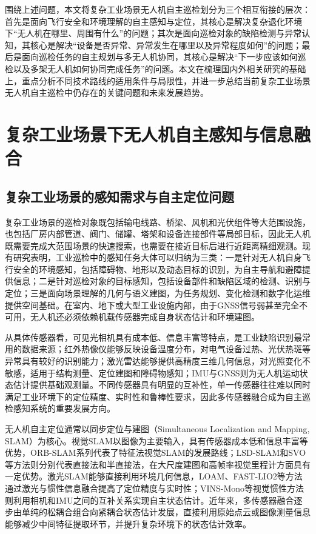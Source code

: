 围绕上述问题，本文将复杂工业场景无人机自主巡检划分为三个相互衔接的层次：首先是面向飞行安全和环境理解的自主感知与定位，其核心是解决复杂退化环境下“无人机在哪里、周围有什么”的问题；其次是面向巡检对象的缺陷检测与异常认知，其核心是解决“设备是否异常、异常发生在哪里以及异常程度如何”的问题；最后是面向巡检任务的自主规划与多无人机协同，其核心是解决“下一步应该如何巡检以及多架无人机如何协同完成任务”的问题。本文在梳理国内外相关研究的基础上，重点分析不同技术路线的适用条件与局限性，并进一步总结当前复杂工业场景无人机自主巡检中仍存在的关键问题和未来发展趋势。

\section{复杂工业场景下无人机自主感知与信息融合}

\subsection{复杂工业场景的感知需求与自主定位问题}

复杂工业场景的巡检对象既包括输电线路、桥梁、风机和光伏组件等大范围设施，也包括厂房内部管道、阀门、储罐、塔架和设备连接部件等局部目标，因此无人机既需要完成大范围场景的快速搜索，也需要在接近目标后进行近距离精细观测。现有研究表明，工业巡检中的感知任务大体可以归纳为三类：一是针对无人机自身飞行安全的环境感知，包括障碍物、地形以及动态目标的识别，为自主导航和避障提供信息；二是针对巡检对象的目标感知，包括设备部件和缺陷区域的检测、识别与定位；三是面向场景理解的几何与语义建图，为任务规划、变化检测和数字化运维提供空间基础\cite{kanellakis2017survey,yeum2015vision,cha2017deep,nex2014uav,tao2019digital}。在室内、地下或大型工业设施内部，由于GNSS信号弱甚至完全不可用，无人机还必须依赖机载传感器完成自身状态估计和环境建图\cite{ozaslan2017autonomous,petrlik2020robust,nil2012review}。

从具体传感器看，可见光相机具有成本低、信息丰富等特点，是工业缺陷识别最常用的数据来源；红外热像仪能够反映设备温度分布，对电气设备过热、光伏热斑等异常具有较好的识别能力\cite{jadin2012recent,usamentiaga2014infrared}；激光雷达能够提供高精度三维几何信息，对光照变化不敏感，适用于结构测量、定位建图和障碍物感知\cite{wujq2021review,zhang2014loam}；IMU与GNSS则为无人机运动状态估计提供基础观测量。不同传感器具有明显的互补性，单一传感器往往难以同时满足工业环境下的定位精度、实时性和鲁棒性要求，因此多传感器融合成为自主巡检感知系统的重要发展方向\cite{panq2003basic,wangj2004survey,hey2000multi}。

无人机自主定位通常以同步定位与建图（Simultaneous Localization and Mapping, SLAM）为核心。视觉SLAM以图像为主要输入，具有传感器成本低和信息丰富等优势，ORB-SLAM系列代表了特征法视觉SLAM的发展路线\cite{durrant2006simultaneous,cadena2016past,mur2015orb,mur2017orb,campos2021orb}；LSD-SLAM和SVO等方法则分别代表直接法和半直接法，在大尺度建图和高帧率视觉里程计方面具有一定优势。激光SLAM能够直接利用环境几何信息，LOAM、FAST-LIO2等方法通过激光与惯性信息融合提高了定位精度与实时性\cite{zhang2014loam,xu2022fast}；VINS-Mono等视觉惯性方法则利用相机和IMU之间的互补关系实现自主状态估计\cite{qin2018vins}。近年来，多传感器融合逐步由单纯的松耦合组合向紧耦合状态估计发展，直接利用原始点云或图像测量信息能够减少中间特征提取环节，并提升复杂环境下的状态估计效率\cite{gupta2022slam,bai2022fasterlio}。

